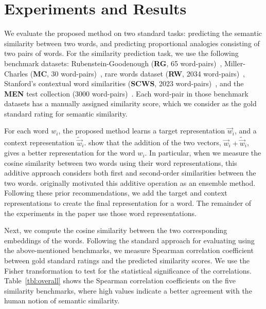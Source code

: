 \documentclass[letterpaper]{article}
\newcommand{\citep}{\cite}
\begin{document}
\section{Experiments and Results}
\label{sec:exp}


We evaluate the proposed method on two standard tasks: predicting the semantic similarity between two words,
and predicting proportional analogies consisting of two pairs of words.
For the similarity prediction task, we use the following benchmark datasets: Rubenstein-Goodenough (\textbf{RG}, 65 word-pairs)~\citep{RG},
Miller-Charles (\textbf{MC}, 30 word-pairs)~\citep{MC}, rare words dataset (\textbf{RW}, 2034 word-pairs)~\citep{Luong:CoNLL:2013},
Stanford's contextual word similarities (\textbf{SCWS}, 2023 word-pairs)~\citep{Huang:ACL:2012},
and the \textbf{MEN} test collection (3000 word-pairs)~\citep{MEN}.
Each word-pair in those benchmark datasets has a manually assigned similarity score,
 which we consider as the gold standard rating for semantic similarity.

For each word $w_i$, the proposed method learns a target representation $\vec{w}_i$, and a context representation $\tilde{\vec{w}}_i$.
\cite{Levy:TACL:2015} show that the addition of the two vectors, $\vec{w}_i + \tilde{\vec{w}}_i$, gives a better
representation for the word $w_i$. In particular, when we measure the cosine similarity between two words using
their word representations, this additive approach considers both first and second-order similarities between the two words.
\cite{Pennington:EMNLP:2014} originally motivated this additive operation as an ensemble method.
Following these prior recommendations, we add the target and context representations to create the final representation for a word.
The remainder of the experiments in the paper use those word representations.

Next, we compute the cosine similarity between the two corresponding
embeddings of the words. Following the standard approach for evaluating using the above-mentioned benchmarks,
we measure Spearman correlation coefficient between gold standard ratings and the predicted similarity scores.
We use the Fisher transformation to test for the statistical significance of the correlations.
Table~\ref{tbl:overall} shows the Spearman correlation coefficients  on the five similarity benchmarks,
where high values indicate a better agreement with the human notion of semantic similarity.
\end{document}
